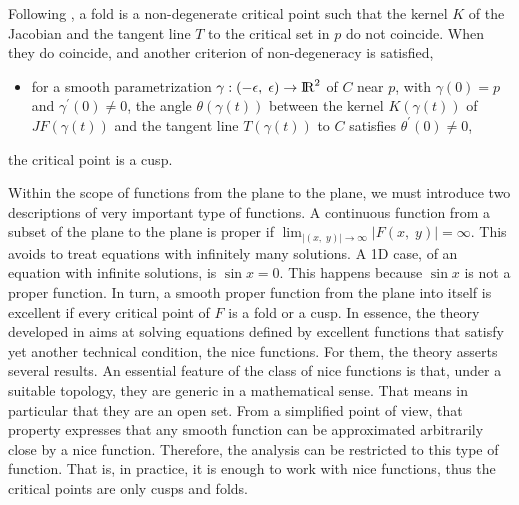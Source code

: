 \documentclass[journal=iecred,manuscript=article]{achemso}
\theoremstyle{definition}
\theoremstyle{remark}
\begin{document}
Following \citet{malta1993}, 
% 
a fold is a non-degenerate critical point such that
%
the kernel $ K $ of the Jacobian and the tangent line $ T $ to the critical set in $ p $ do not coincide. When they do coincide, and another criterion of non-degeneracy is satisfied, 
%
\begin{itemize}
\item for a smooth parametrization $ \gamma : \left( -\epsilon, \; \epsilon \right) \to {\text{I\!R}}^2 $ of $ C $ near $ p $, with $ \gamma \left(0\right) = p $ and $ \gamma^{\prime} \left(0\right) \neq 0 $, the angle $ \theta\left(\gamma\left(t\right)\right) $ between the kernel $ K\left(\gamma\left(t\right)\right) $ of $ JF\left(\gamma\left(t\right)\right) $ and the tangent line $ T\left(\gamma\left(t\right)\right) $ to $ C $ satisfies $ \theta^{\prime}\left(0\right) \neq 0 $,
\end{itemize}
the critical point  is a cusp.

Within the scope of  functions from the plane to the plane, we 
must introduce two descriptions of very important type of 
functions. 
A continuous function from a subset of the plane to the plane 
is proper if  $\lim_{\vert\left(x,\;y\right)\vert\to\infty} \vert F\left(x,\;y\right)\vert = \infty$. This avoids to
treat equations with infinitely many solutions. A 1D case, of an equation with infinite solutions, is $\sin x=0$. This happens because $\sin x$ is not a proper function. 
%
In turn, a smooth proper function from the plane into itself is excellent if every critical point of $ F $ is a fold or a cusp. In essence, the theory developed in \citet{malta} aims
at solving equations defined by excellent functions that 
satisfy yet another technical condition, the nice 
functions. For them, the theory 
asserts several results. 
An essential feature of the class of nice functions 
is that, under a suitable topology, they are generic
in a mathematical sense.
That means in particular
that they are an open set. From a simplified point of view, 
that property expresses that any smooth
function can be approximated arbitrarily close by a nice function. 
 Therefore,
the analysis can be restricted to this type of function.
That is, in practice, it is enough to work 
with nice functions, thus the critical points are only 
cusps and folds.


\end{document}
